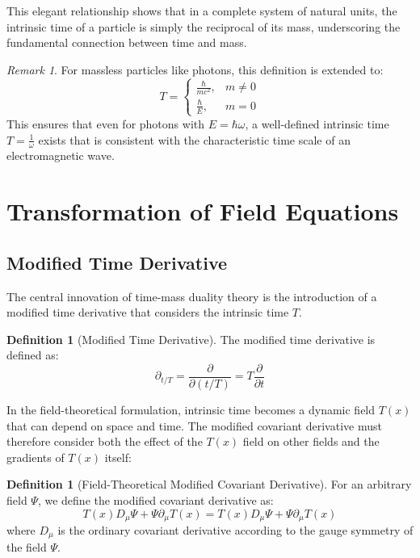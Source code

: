 \documentclass{article}
\theoremstyle{definition}
\newtheorem{definition}[theorem]{Definition}
\theoremstyle{remark}
\newtheorem{remark}[theorem]{Remark}
\newcommand{\Tfield}{T(x)} %
\newcommand{\DcovT}[1]{\Tfield D_\mu #1 + #1 \partial_\mu \Tfield}
\begin{document}
	This elegant relationship shows that in a complete system of natural units, the intrinsic time of a particle is simply the reciprocal of its mass, underscoring the fundamental connection between time and mass.
	
	\begin{remark}
		For massless particles like photons, this definition is extended to:
		\begin{equation}
			T = 
			\begin{cases}
				\frac{\hbar}{mc^2}, & m \neq 0 \\
				\frac{\hbar}{E}, & m = 0
			\end{cases}
		\end{equation}
		This ensures that even for photons with $E = \hbar\omega$, a well-defined intrinsic time $T = \frac{1}{\omega}$ exists that is consistent with the characteristic time scale of an electromagnetic wave.
	\end{remark}
	
	\section{Transformation of Field Equations}
	
	\subsection{Modified Time Derivative}
	
	The central innovation of time-mass duality theory is the introduction of a modified time derivative that considers the intrinsic time $T$.
	
	\begin{definition}[Modified Time Derivative]
		The modified time derivative is defined as:
		\begin{equation}
			\partial_{t/T} = \frac{\partial}{\partial(t/T)} = T\frac{\partial}{\partial t}
		\end{equation}
	\end{definition}
	
	In the field-theoretical formulation, intrinsic time becomes a dynamic field $\Tfield$ that can depend on space and time. The modified covariant derivative must therefore consider both the effect of the $\Tfield$ field on other fields and the gradients of $\Tfield$ itself:
	
	\begin{definition}[Field-Theoretical Modified Covariant Derivative]
		For an arbitrary field $\Psi$, we define the modified covariant derivative as:
		\begin{equation}
			\DcovT{\Psi} = \Tfield D_\mu \Psi + \Psi \partial_\mu \Tfield
		\end{equation}
		where $D_\mu$ is the ordinary covariant derivative according to the gauge symmetry of the field $\Psi$.
	\end{definition}
	
\end{document}
